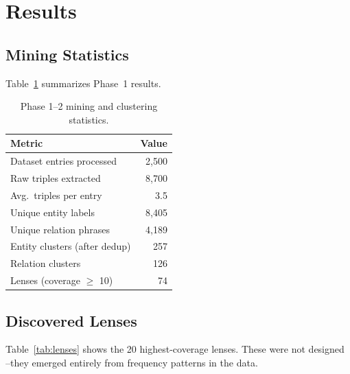 \documentclass[11pt]{article}
\begin{document}
\section{Results}
\label{sec:results}

\subsection{Mining Statistics}

Table~\ref{tab:mining} summarizes Phase~1 results.

\begin{table}[h]
\centering
\small
\begin{tabular}{lr}
\toprule
\textbf{Metric} & \textbf{Value} \\
\midrule
Dataset entries processed     & 2,500 \\
Raw triples extracted         & 8,700 \\
Avg.\ triples per entry       & 3.5 \\
Unique entity labels          & 8,405 \\
Unique relation phrases       & 4,189 \\
\midrule
Entity clusters (after dedup) & 257 \\
Relation clusters             & 126 \\
Lenses (coverage $\geq$ 10)  & 74 \\
\bottomrule
\end{tabular}
\caption{Phase 1--2 mining and clustering statistics.}
\label{tab:mining}
\end{table}

\subsection{Discovered Lenses}

Table~\ref{tab:lenses} shows the 20 highest-coverage lenses.
These were not designed --they emerged entirely from frequency patterns in
the data.
\end{document}
